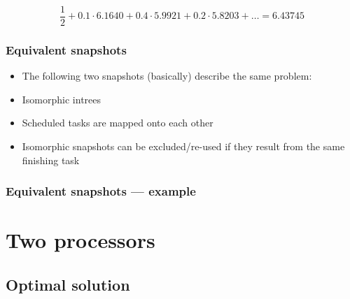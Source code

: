 \documentclass{beamer}
\newcommand{\todo}[1]{ {\color{red}{#1} }}
\begin{document}
\begin{frame}
  \begin{equation*}
    \frac{1}{2}
    + 0.1 \cdot 6.1640
    + 0.4 \cdot 5.9921
    + 0.2 \cdot 5.8203
    + \dots
    = 6.43745
  \end{equation*}
\end{frame}

\begin{frame}
  \frametitle{Equivalent snapshots}
  \begin{itemize}
  \item The following two snapshots (basically) describe the same problem:
    \todo{Bilder!}
  \item Isomorphic intrees
  \item Scheduled tasks are mapped onto each other
  \item Isomorphic snapshots can be excluded/re-used if they result from the same finishing task
  \end{itemize}
\end{frame}

\begin{frame}
  \frametitle{Equivalent snapshots --- example}
  \begin{center}
  \end{center}
\end{frame}

\section{Two processors}

\subsection{Optimal solution}
\end{document}
